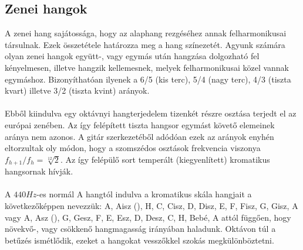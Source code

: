 \subsection{Zenei hangok}
\label{sec:zeneihangok}
A zenei hang sajátossága, hogy az alaphang rezgéséhez annak felharmonikusai társulnak. Ezek összetétele határozza meg a hang színezetét. Agyunk számára olyan zenei hangok együtt-, vagy egymás után hangzása dolgozható fel kényelmesen, illetve hangzik kellemesnek, melyek felharmonikusai közel vannak egymáshoz. Bizonyíthatóan ilyenek a 6/5 (kis terc), 5/4 (nagy terc), 4/3 (tiszta kvart) illetve 3/2 (tiszta kvint) arányok. \\\\
Ebből kiindulva egy oktávnyi hangterjedelem tizenkét részre osztása terjedt el az európai zenében.
Az így felépített tiszta hangsor egymást követő elemeinek aránya nem azonos. A gitár szerkezetéből adódóan ezek az arányok enyhén eltorzultak oly módon, hogy a szomszédos osztások frekvencia viszonya $f_{h+1}/f_{h}=\sqrt[12]{2}$. Az így felépülő sort temperált (kiegyenlített) kromatikus hangsornak hívják. \\\\
A $440Hz$-es normál A hangtól indulva a kromatikus skála hangjait a következőképpen nevezzük: A, Aisz (\aisz), H, C, Cisz, D, Disz, E, F, Fisz, G, Gisz, A vagy A, Asz (\asz), G, Gesz, F, E, Esz, D, Desz, C, H, Bebé, A attól függően, hogy növekvő-, vagy csökkenő hangmagasság irányában haladunk. Oktávon túl a betűzés ismétlődik, ezeket a hangokat vesszőkkel szokás megkülönböztetni.
